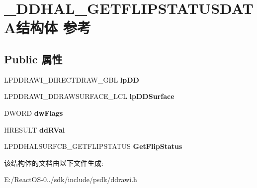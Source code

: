 \hypertarget{struct___d_d_h_a_l___g_e_t_f_l_i_p_s_t_a_t_u_s_d_a_t_a}{}\section{\+\_\+\+D\+D\+H\+A\+L\+\_\+\+G\+E\+T\+F\+L\+I\+P\+S\+T\+A\+T\+U\+S\+D\+A\+T\+A结构体 参考}
\label{struct___d_d_h_a_l___g_e_t_f_l_i_p_s_t_a_t_u_s_d_a_t_a}
\subsection*{Public 属性}
\begin{DoxyCompactItemize}
\item 
\mbox{\label{struct___d_d_h_a_l___g_e_t_f_l_i_p_s_t_a_t_u_s_d_a_t_a_a6fb46df7b0139767e47cb92cc3bf0bbd}} 
L\+P\+D\+D\+R\+A\+W\+I\+\_\+\+D\+I\+R\+E\+C\+T\+D\+R\+A\+W\+\_\+\+G\+BL {\bfseries lp\+DD}
\item 
\mbox{\label{struct___d_d_h_a_l___g_e_t_f_l_i_p_s_t_a_t_u_s_d_a_t_a_ac825e43d55f4d6e1184ab96366863db6}} 
L\+P\+D\+D\+R\+A\+W\+I\+\_\+\+D\+D\+R\+A\+W\+S\+U\+R\+F\+A\+C\+E\+\_\+\+L\+CL {\bfseries lp\+D\+D\+Surface}
\item 
\mbox{\label{struct___d_d_h_a_l___g_e_t_f_l_i_p_s_t_a_t_u_s_d_a_t_a_a5e2bc915e3be4d9317e2c0ae2d1d7f88}} 
D\+W\+O\+RD {\bfseries dw\+Flags}
\item 
\mbox{\label{struct___d_d_h_a_l___g_e_t_f_l_i_p_s_t_a_t_u_s_d_a_t_a_a39a18745444ee31f16d13f4af96108ff}} 
H\+R\+E\+S\+U\+LT {\bfseries dd\+R\+Val}
\item 
\mbox{\label{struct___d_d_h_a_l___g_e_t_f_l_i_p_s_t_a_t_u_s_d_a_t_a_a18ef0729b952fc0d3aad7835de13bb0b}} 
L\+P\+D\+D\+H\+A\+L\+S\+U\+R\+F\+C\+B\+\_\+\+G\+E\+T\+F\+L\+I\+P\+S\+T\+A\+T\+US {\bfseries Get\+Flip\+Status}
\end{DoxyCompactItemize}


该结构体的文档由以下文件生成\+:\begin{DoxyCompactItemize}
\item 
E\+:/\+React\+O\+S-\/0../sdk/include/psdk/ddrawi.\+h\end{DoxyCompactItemize}

